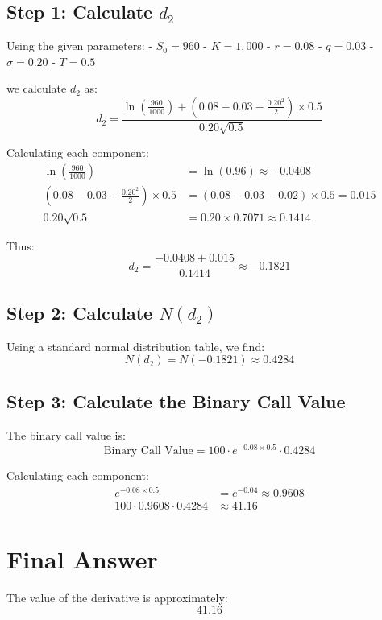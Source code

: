 \documentclass{article}
\begin{document}
\subsection{\textbf{Step 1: Calculate \( d_2 \)}}

Using the given parameters:
- \( S_0 = 960 \)
- \( K = 1,000 \)
- \( r = 0.08 \)
- \( q = 0.03 \)
- \( \sigma = 0.20 \)
- \( T = 0.5 \)

we calculate \( d_2 \) as:
\[
d_2 = \frac{\ln\left(\frac{960}{1000}\right) + \left(0.08 - 0.03 - \frac{0.20^2}{2}\right) \times 0.5}{0.20 \sqrt{0.5}}
\]

Calculating each component:
\begin{align*}
\ln\left(\frac{960}{1000}\right) &= \ln(0.96) \approx -0.0408 \\
\left(0.08 - 0.03 - \frac{0.20^2}{2}\right) \times 0.5 &= \left(0.08 - 0.03 - 0.02\right) \times 0.5 = 0.015 \\
0.20 \sqrt{0.5} &= 0.20 \times 0.7071 \approx 0.1414
\end{align*}

Thus:
\[
d_2 = \frac{-0.0408 + 0.015}{0.1414} \approx -0.1821
\]

\subsection{\textbf{Step 2: Calculate \( N(d_2) \)}}

Using a standard normal distribution table, we find:
\[
N(d_2) = N(-0.1821) \approx 0.4284
\]

\subsection{\textbf{Step 3: Calculate the Binary Call Value}}

The binary call value is:
\[
\text{Binary Call Value} = 100 \cdot e^{-0.08 \times 0.5} \cdot 0.4284
\]

Calculating each component:
\begin{align*}
e^{-0.08 \times 0.5} &= e^{-0.04} \approx 0.9608 \\
100 \cdot 0.9608 \cdot 0.4284 &\approx 41.16
\end{align*}

\section*{\textbf{Final Answer}}

The value of the derivative is approximately:
\[
\boxed{41.16}
\]
\end{document}
